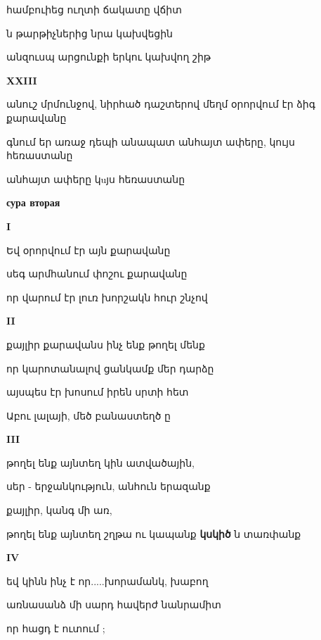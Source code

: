 համբուիեց ուղտի ճակատը վճիտ


ն թարթիչներից նրա կախվեցին



անզուսպ արցունքի երկու կախվող շիթ


\centerline {\bf XXIII}



 անուշ մրմունջով, նիրհած դաշտերով մեղմ օրորվում էր ձիգ քարավանը


 գնում  եր  առաջ դեպի անապատ անհայտ ափերը, կույս հեռաստանը


 անհայտ ափերը կuյս հեռաստանը

   
\centerline {\bf сура вторая }





\centerline {\bf I}

Եվ օրորվում էր այն քարավանը


սեգ արմհանում փոշու քարավանը


որ վարում էր լուռ խորշակն հուր շնչով



\centerline{\bf II}


քայլիր քարավանս  ինչ  ենք թողել մենք 


որ կարոտանալով ցանկամք մեր դարձը


այսպես էր խոսում իրեն սրտի հետ


Աբու  լալայի, մեծ բանաստեղծ                                                                                                                                                                                                                                                                                                                                                                                                                                          ը


\centerline{\bf  III}

թողել ենք այնտեղ կին ատվածային, 


սեր - երջանկություն,  անհուն երազանք


քայլիր, կանգ մի առ,


թողել ենք այնտեղ շղթա ու  կապանք {\bf կսկիծ} ն  տառփանք


\centerline  {\bf IV  }


եվ կինն ինչ է որ.....խորամանկ, խաբող



առնասանձ  մի սարդ հավերժ նանրամիտ


որ   հացդ է ուտում ;


